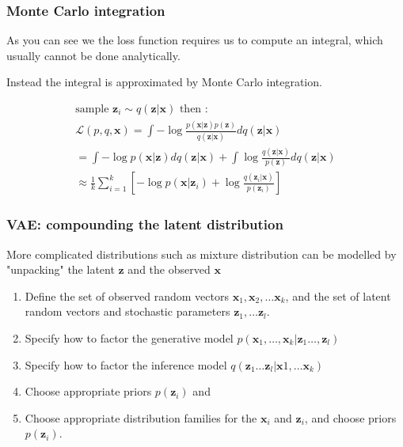 \documentclass[final]{beamer}
\theoremstyle{plain}
\theoremstyle{definition}
\theoremstyle{remark}
\newcommand{\x}{\mathbf{x}}
\newcommand{\z}{\mathbf{z}}
\newcommand{\LL}{\mathcal{L}}
\begin{document}
\begin{frame}
\frametitle{Monte Carlo integration}
As you can see we the loss function requires us to compute an integral, which
usually cannot be done analytically.

Instead the integral is approximated by Monte Carlo integration.

{\small
\begin{equation}
\begin{aligned}
\text{sample  } \z_i \sim q(\z | \x) \text{   then :}\\
\LL(p,q,\x) = 
\int - \log \frac{p(\x|\z)p(\z)}{q(\z|\x)}dq(\z|\x) \\
= \int -\log p(\x|\z)dq(\z|\x) + 
\int \log \frac{q(\z|\x)}{p(\z)}dq(\z|\x) \\
\approx \frac{1}{k} \sum_{i=1}^k [-\log p(\x|\z_i)
+ \log \frac{q(\z_i|\x)}{p(\z_i)} ]
\label{eq:elbomc}
\end{aligned}
\end{equation}
}

\end{frame}


\begin{frame}
\frametitle{VAE: compounding the latent distribution}
More complicated distributions such as mixture distribution
can be modelled by "unpacking" the latent $\z$ and the observed $\x$
\label{VAE-specs}
\begin{enumerate}
\item{} Define the set of observed random vectors $\x_1, \x_2, \dots \x_k$, and 
the set of latent random vectors and stochastic parameters $\z_1, \dots \z_l$.
\item{} Specify how to factor the generative model $p(\x_1,\dots, \x_k| \z_1
\dots , \z_l)$
\item{} Specify how to factor the inference model $q(\z_1 \dots \z_l | \x1,
\dots \x_k)$
\item{} Choose appropriate priors $p(\z_i)$ and
\item{} Choose appropriate distribution families for the $\x_i$ and $\z_i$,
and choose priors $p(\z_i)$.
\end{enumerate}

\end{frame}
\end{document}

